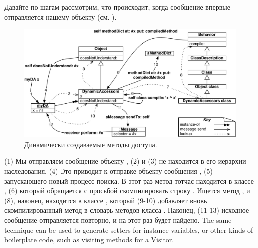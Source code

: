 \documentclass[a4paper,10pt,twoside]{book}
\begin{document}
Давайте по шагам рассмотрим, что происходит, когда сообщение  впервые отправляется нашему объекту (см. ).

\begin{figure}[ht]\centering
	\includegraphics[width=\linewidth]{DynamicAccessors}
	\caption{Динамически создаваемые методы доступа.\figlabel{DynamicAccessors}}
\end{figure}

(1) Мы отправляем сообщение  объекту , (2)  и (3) не находится в его иерархии наследования. (4) Это приводит к отправке объекту сообщения , (5) запускающего новый процесс поиска. В этот раз метод  тотчас находится в классе , (6) который обращается  с просьбой скомпилировать строку . Ищется метод , и (8), наконец, находится в классе , который (9-10) добавляет вновь скомпилированный метод в словарь методов класса . Наконец, (11-13) исходное сообщение отправляется повторно, и на этот раз будет найдено.
The same technique can be used to generate setters for instance variables, or other kinds of boilerplate code, such as visiting methods for a Visitor.
\end{document}

